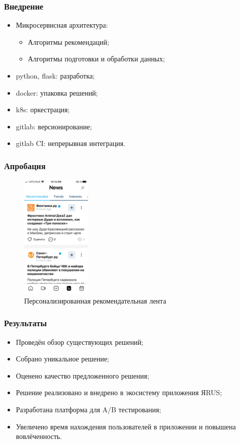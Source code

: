 \documentclass[xetex,mathserif,serif]{beamer}
\begin{document}
\begin{frame}
	\frametitle{Внедрение}

	\begin{itemize}
		\item Микросервисная архитектура:
            \begin{itemize}
                \item Алгоритмы рекомендаций;
                \item Алгоритмы подготовки и обработки данных;
            \end{itemize}
		\item python, flask: разработка;
		\item docker: упаковка решений;
		\item k8s: оркестрация;
		\item gitlab: версионирование; 
		\item gitlab CI: непрерывная интеграция.
	\end{itemize}
\end{frame}



\begin{frame}
	\frametitle{Апробация}

    \begin{figure}[h]
        \includegraphics[width=0.3\textwidth]{./images/screenshot.png}
        \caption{Персонализированная рекомендательная лента}
        \label{fig:feed}
        \centering
    \end{figure}

\end{frame}


\begin{frame}
	\frametitle{Результаты}
	\begin{itemize}
		\item Проведён обзор существующих решений;
		\item Собрано уникальное решение;
		\item Оценено качество предложенного решения;
		\item Решение реализовано и внедрено в экосистему приложения ЯRUS;
        \item Разработана платформа для A/B тестирования;
		\item Увеличено время нахождения пользователей в приложении и повышена вовлёченность.
	\end{itemize}
\end{frame}
\end{document}

